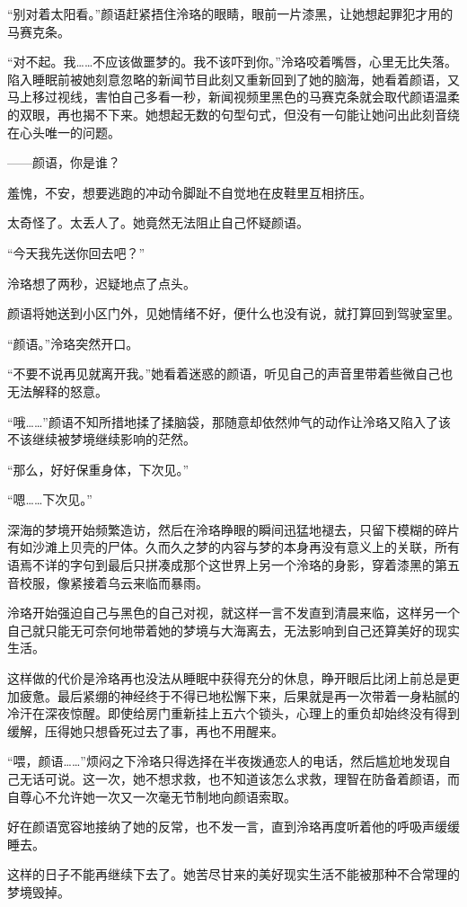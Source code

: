 \documentclass[UTF8, scheme = chinese, openany]{ctexbook}
\begin{document}
“别对着太阳看。”颜语赶紧捂住泠珞的眼睛，眼前一片漆黑，让她想起罪犯才用的马赛克条。

“对不起。我……不应该做噩梦的。我不该吓到你。”泠珞咬着嘴唇，心里无比失落。陷入睡眠前被她刻意忽略的新闻节目此刻又重新回到了她的脑海，她看着颜语，又马上移过视线，害怕自己多看一秒，新闻视频里黑色的马赛克条就会取代颜语温柔的双眼，再也揭不下来。她想起无数的句型句式，但没有一句能让她问出此刻音绕在心头唯一的问题。

——颜语，你是谁？

羞愧，不安，想要逃跑的冲动令脚趾不自觉地在皮鞋里互相挤压。

太奇怪了。太丢人了。她竟然无法阻止自己怀疑颜语。

“今天我先送你回去吧？”

泠珞想了两秒，迟疑地点了点头。

颜语将她送到小区门外，见她情绪不好，便什么也没有说，就打算回到驾驶室里。

“颜语。”泠珞突然开口。

“不要不说再见就离开我。”她看着迷惑的颜语，听见自己的声音里带着些微自己也无法解释的怒意。

“哦……”颜语不知所措地揉了揉脑袋，那随意却依然帅气的动作让泠珞又陷入了该不该继续被梦境继续影响的茫然。

“那么，好好保重身体，下次见。”

“嗯……下次见。”

深海的梦境开始频繁造访，然后在泠珞睁眼的瞬间迅猛地褪去，只留下模糊的碎片有如沙滩上贝壳的尸体。久而久之梦的内容与梦的本身再没有意义上的关联，所有语焉不详的字句到最后只拼凑成那个这世界上另一个泠珞的身影，穿着漆黑的第五音校服，像紧接着乌云来临而暴雨。

泠珞开始强迫自己与黑色的自己对视，就这样一言不发直到清晨来临，这样另一个自己就只能无可奈何地带着她的梦境与大海离去，无法影响到自己还算美好的现实生活。

这样做的代价是泠珞再也没法从睡眠中获得充分的休息，睁开眼后比闭上前总是更加疲惫。最后紧绷的神经终于不得已地松懈下来，后果就是再一次带着一身粘腻的冷汗在深夜惊醒。即使给房门重新挂上五六个锁头，心理上的重负却始终没有得到缓解，压得她只想昏死过去了事，再也不用醒来。

“喂，颜语……”烦闷之下泠珞只得选择在半夜拨通恋人的电话，然后尴尬地发现自己无话可说。这一次，她不想求救，也不知道该怎么求救，理智在防备着颜语，而自尊心不允许她一次又一次毫无节制地向颜语索取。

好在颜语宽容地接纳了她的反常，也不发一言，直到泠珞再度听着他的呼吸声缓缓睡去。

这样的日子不能再继续下去了。她苦尽甘来的美好现实生活不能被那种不合常理的梦境毁掉。
\end{document}
